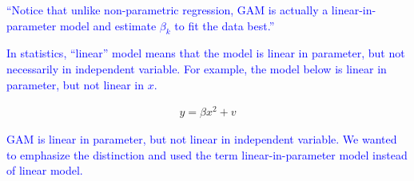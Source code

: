 \documentclass[
]{article}
\begin{document}
\begin{itemize}
\textcolor{blue}{``Notice that unlike non-parametric regression, GAM is actually a linear-in-parameter model and estimate $\beta_k$ to fit the data best.''}

\textcolor{blue}{In statistics, ``linear'' model means that the model is linear in parameter, but not necessarily in independent variable. For example, the model below is linear in parameter, but not linear in $x$.} 

\begin{align}
  y = \beta x^2 + v
\end{align}  

\textcolor{blue}{ GAM is linear in parameter, but not linear in independent variable. We wanted to emphasize the distinction and used the term linear-in-parameter model instead of linear model.} 

\end{itemize}
\end{document}
